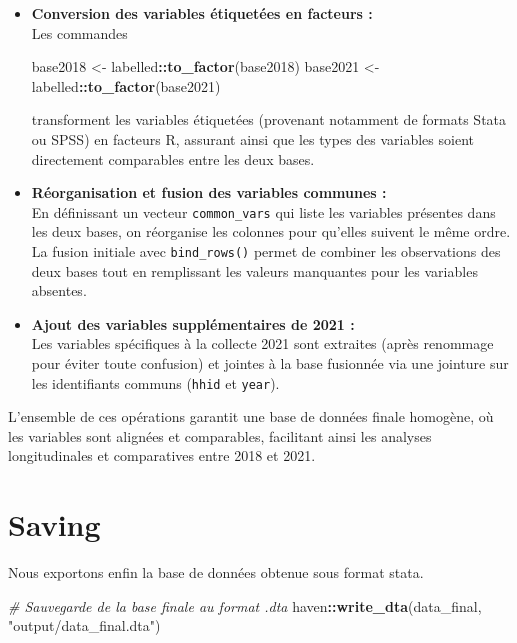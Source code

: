 \documentclass[
]{article}
\newenvironment{Shaded}{\begin{snugshade}}{\end{snugshade}}
\newcommand{\CommentTok}[1]{\textcolor[rgb]{0.56,0.35,0.01}{\textit{#1}}}
\newcommand{\FunctionTok}[1]{\textcolor[rgb]{0.13,0.29,0.53}{\textbf{#1}}}
\newcommand{\NormalTok}[1]{#1}
\newcommand{\OtherTok}[1]{\textcolor[rgb]{0.56,0.35,0.01}{#1}}
\newcommand{\SpecialCharTok}[1]{\textcolor[rgb]{0.81,0.36,0.00}{\textbf{#1}}}
\newcommand{\StringTok}[1]{\textcolor[rgb]{0.31,0.60,0.02}{#1}}
\begin{document}
\begin{itemize}
\item
  \textbf{Conversion des variables étiquetées en facteurs :}\\
  Les commandes

\begin{Shaded}
\begin{Highlighting}[]
\NormalTok{base2018 }\OtherTok{\textless{}{-}}\NormalTok{ labelled}\SpecialCharTok{::}\FunctionTok{to\_factor}\NormalTok{(base2018)}
\NormalTok{base2021 }\OtherTok{\textless{}{-}}\NormalTok{ labelled}\SpecialCharTok{::}\FunctionTok{to\_factor}\NormalTok{(base2021)}
\end{Highlighting}
\end{Shaded}

  transforment les variables étiquetées (provenant notamment de formats
  Stata ou SPSS) en facteurs R, assurant ainsi que les types des
  variables soient directement comparables entre les deux bases.
\item
  \textbf{Réorganisation et fusion des variables communes :}\\
  En définissant un vecteur \texttt{common\_vars} qui liste les
  variables présentes dans les deux bases, on réorganise les colonnes
  pour qu'elles suivent le même ordre. La fusion initiale avec
  \texttt{bind\_rows()} permet de combiner les observations des deux
  bases tout en remplissant les valeurs manquantes pour les variables
  absentes.
\item
  \textbf{Ajout des variables supplémentaires de 2021 :}\\
  Les variables spécifiques à la collecte 2021 sont extraites (après
  renommage pour éviter toute confusion) et jointes à la base fusionnée
  via une jointure sur les identifiants communs (\texttt{hhid} et
  \texttt{year}).
\end{itemize}

L'ensemble de ces opérations garantit une base de données finale
homogène, où les variables sont alignées et comparables, facilitant
ainsi les analyses longitudinales et comparatives entre 2018 et 2021.

\hypertarget{saving}{%
\section{Saving}\label{saving}}

Nous exportons enfin la base de données obtenue sous format stata.

\begin{Shaded}
\begin{Highlighting}[]
\CommentTok{\# Sauvegarde de la base finale au format .dta}
\NormalTok{haven}\SpecialCharTok{::}\FunctionTok{write\_dta}\NormalTok{(data\_final, }\StringTok{"output/data\_final.dta"}\NormalTok{)}
\end{Highlighting}
\end{Shaded}
\end{document}

